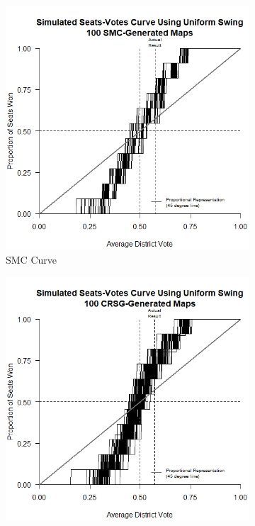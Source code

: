 \begin{figure}[h]
    \caption{Seats-Votes Curves for SMC- and CRSG-Generated Maps and Existing Map}
    \begin{subfigure}[b]{0.45\textwidth}
        \includegraphics[width=\textwidth]{img/sv.smc.png}
        \caption{SMC Curve}
        \label{fig:sv.smc}
    \end{subfigure}
    \hfill
    \begin{subfigure}[b]{0.45\textwidth}
        \includegraphics[width=\textwidth]{img/sv.crsg.png}

\end{subfigure}
\end{figure}
